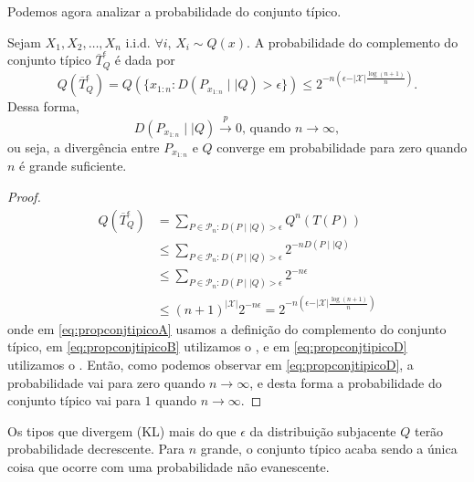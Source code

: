 Podemos agora analizar a probabilidade do conjunto típico.
\begin{theorem}
  Sejam $X_1, X_2, \ldots, X_n$ i.i.d. $\forall i$, $X_i \sim Q(x)$. A probabilidade do complemento
  do conjunto típico $\overline{T}^{\epsilon}_Q$ é dada por
  \begin{equation}
    Q(\overline{T}^{\epsilon}_Q) = Q( \{ x_{1:n} : D(P_{x_{1:n}} \mid\mid Q) > \epsilon  \} ) \leq 2^{-n (\epsilon - \vert \mathcal{X} \vert \frac{\log (n+1)}{n})} .
  \end{equation}
  Dessa forma,
  \begin{equation}
    D(P_{x_{1:n}} \mid\mid Q) \xrightarrow{p} 0 \text{, quando } n \rightarrow \infty ,
  \end{equation}
  ou seja, a divergência entre $P_{x_{1:n}}$ e $Q$ converge em probabilidade para zero quando $n$ é grande suficiente.
  \end{theorem}
  \begin{proof}
  \begin{subequations}\label{eq:propconjtipico}
  \begin{align}
  Q(\overline{T}^{\epsilon}_Q) &= \sum_{P \in \mathcal{P}_n : D(P \mid\mid Q) > \epsilon} Q^n (T(P)) \label{eq:propconjtipicoA}\\
        &\leq \sum_{P \in \mathcal{P}_n : D(P \mid\mid Q) > \epsilon} 2^{-n D(P\mid\mid Q)} \label{eq:propconjtipicoB}\\
        &\leq \sum_{P \in \mathcal{P}_n : D(P \mid\mid Q) > \epsilon} 2^{-n \epsilon} \label{eq:propconjtipicoC}\\
        &\leq (n+1)^{\vert \mathcal{X}  \vert} 2^{-n \epsilon} = 2^{-n \left( \epsilon - \vert \mathcal{X} \vert \frac{\log (n+1)}{n}  \right)} \label{eq:propconjtipicoD}
  \end{align}
  \end{subequations}
  onde em \ref{eq:propconjtipicoA} usamos a definição do complemento do conjunto típico,
  em \ref{eq:propconjtipicoB} utilizamos o ,
  e em \ref{eq:propconjtipicoD} utilizamos o .
    Então, como podemos observar em \ref{eq:propconjtipicoD}, 
    a probabilidade vai para zero quando $n \rightarrow \infty$, e desta forma a probabilidade do conjunto típico vai para $1$ quando $n \rightarrow \infty$.
  \end{proof}
Os tipos que divergem (KL) mais do que $\epsilon$ da distribuição subjacente $Q$ terão probabilidade decrescente.
Para $n$ grande, o conjunto típico acaba sendo a única coisa que ocorre com uma probabilidade não evanescente.









